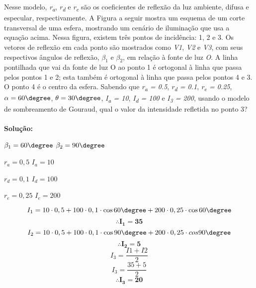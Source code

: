Nesse modelo, \emph{r\textsubscript{a}}, \emph{r\textsubscript{d}} e \emph{r\textsubscript{e}} são os coeficientes de reflexão da luz ambiente, difusa e especular, respectivamente. A Figura a seguir mostra um esquema de um corte transversal de uma esfera, mostrando um cenário de iluminação que usa a equação acima. Nessa figura, existem três pontos de incidência: 1, 2 e 3. Os vetores de reflexão em cada ponto são mostrados como \emph{V1}, \emph{V2} e \emph{V3}, com seus respectivos ângulos de reflexão, $\beta_1$ e $\beta_2$, em relação à fonte de luz \emph{O}. A linha pontilhada que vai da fonte de luz O ao ponto 1 é ortogonal à linha que passa pelos pontos 1 e 2; esta também é ortogonal à linha que passa pelos pontos 4 e 3. O ponto 4 é o centro da esfera. Sabendo que \emph{r\textsubscript{a} = 0.5}, \emph{r\textsubscript{d} = 0.1}, \emph{r\textsubscript{e} = 0.25}, $\alpha = 60\degree$, $\theta = 30\degree$, \emph{I\textsubscript{a} = 10}, \emph{I\textsubscript{d} = 100} e \emph{I\textsubscript{3} = 200}, usando o modelo de sombreamento de Gouraud, qual o valor da intensidade refletida no ponto 3?\\
\\
\noindent\textbf{Solução:}
\begin{center}
    $\beta_1 = 60\degree$ \hspace{20pt} $\beta_2 = 90\degree$
\end{center}
\begin{center}
    $r_a = 0,5$ \hspace{20pt} $I_a = 10$
\end{center}
\begin{center}
    $r_d = 0,1$ \hspace{20pt} $I_d = 100$
\end{center}
\begin{center}
    $r_e = 0,25$ \hspace{20pt} $I_e = 200$
\end{center}
\[I_1 = 10 \cdot 0,5 + 100 \cdot 0,1 \cdot \cos{60\degree} + 200 \cdot 0,25 \cdot \cos{60\degree}\]
\[\therefore \mathbf{I_1 = 35}\]
\vspace{0.2cm}
\[I_2 = 10 \cdot 0,5 + 100 \cdot 0,1 \cdot \cos{90\degree} + 200 \cdot 0,25 \cdot cos{90\degree}\]
\[\therefore \mathbf{I_2 = 5}\]
\vspace{0.2cm}
\[I_3 = \frac{I1 + I2}{2}\]
\[I_3 = \frac{35 + 5}{2}\]
\[\therefore \mathbf{I_3 = 20}\]



